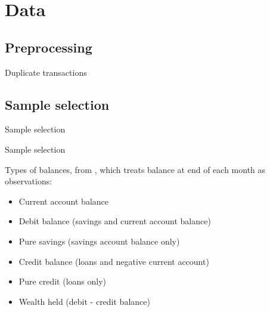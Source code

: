 
\section{Data}%
\label{sec:data}

\subsection{Preprocessing}%
\label{sub:preprocessing}

Duplicate transactions


\subsection{Sample selection}%
\label{sub:sample_selection}


\begin{table}[ht]
\caption{Sample selection}\label{tab:selection}

\end{table}


\begin{table}[ht]
\caption{Sample selection}\label{tab:selection}

\end{table}


Types of balances, from \citet{becker2017does}, which treats balance at end of
each month as observations:

\begin{itemize}
    \item Current account balance
    \item Debit balance (savings and current account balance)
    \item Pure savings (savings account balance only)
    \item Credit balance (loans and negative current account)
    \item Pure credit (loans only)
    \item Wealth held (debit - credit balance)
\end{itemize}
